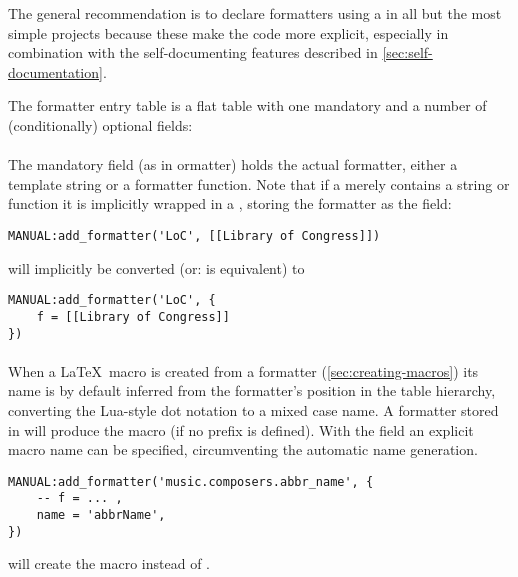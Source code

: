 \documentclass[12pt]{scrartcl}
\begin{document}
The general recommendation is to declare formatters using a  in all but the most simple projects because these make the code
more explicit, especially in combination with the self-documenting features
described in \vref{sec:self-documentation}.

The formatter entry table is a flat table with one mandatory and a number of
(conditionally) optional fields:

\paragraph{}

The mandatory field  (as in ormatter) holds the
actual formatter, either a template string or a formatter function.  Note that
if a  merely contains a string or function it is
implicitly wrapped in a , storing the formatter as
the  field:


\begin{verbatim}
MANUAL:add_formatter('LoC', [[Library of Congress]])
\end{verbatim}

\noindent will implicitly be converted (or: is equivalent) to

\begin{verbatim}
MANUAL:add_formatter('LoC', {
	f = [[Library of Congress]]
})
\end{verbatim}


\paragraph{}

When a \LaTeX\ macro is created from a formatter (\vref{sec:creating-macros}) its name is by default inferred from the
formatter's position in the table hierarchy, converting the Lua-style dot
notation to a mixed case name.  A formatter stored in 
will produce the macro  (if no prefix is defined).  With the
 field an explicit macro name can be specified, circumventing the
automatic name generation.

\begin{verbatim}
MANUAL:add_formatter('music.composers.abbr_name', {
	-- f = ... ,
	name = 'abbrName',
})
\end{verbatim}

\noindent will create the macro  instead of .
\end{document}

